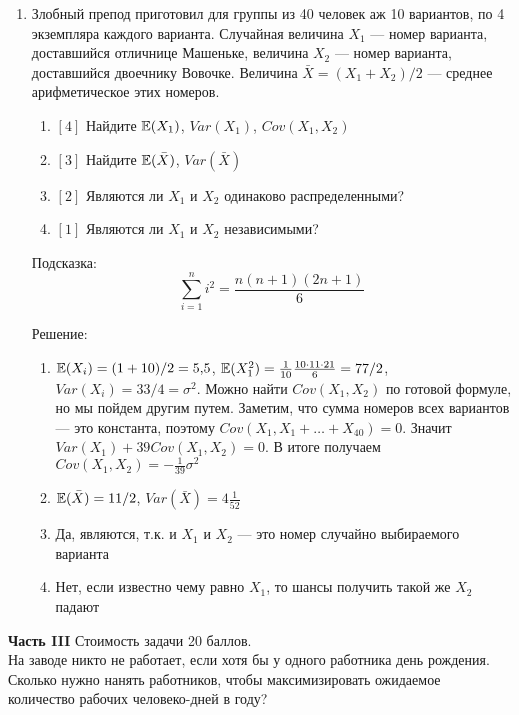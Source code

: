 \documentclass[pdftex,12pt,a4paper]{article}
\begin{document}
\begin{enumerate}
\item Злобный препод приготовил для группы из 40 человек аж 10 вариантов, по 4 экземпляра каждого варианта. Случайная величина $X_1$ --- номер варианта, доставшийся отличнице Машеньке, величина $X_2$ --- номер варианта, доставшийся двоечнику Вовочке. Величина $\bar{X}=(X_1+X_2)/2$ --- среднее арифметическое этих номеров.
\begin{enumerate}
\item $[4]$ Найдите $\mathbb{E}(X_1)$, $Var(X_1)$, $Cov(X_1,X_2)$
\item $[3]$ Найдите $\mathbb{E}(\bar{X})$, $Var(\bar{X})$
\item $[2]$ Являются ли $X_1$ и $X_2$ одинаково распределенными?
\item $[1]$ Являются ли $X_1$ и $X_2$ независимыми?
\end{enumerate}

Подсказка:
\begin{equation}
\sum_{i=1}^{n} i^2=\frac{n(n+1)(2n+1)}{6} 
\end{equation}

Решение:
\begin{enumerate}
\item $\mathbb{E}(X_i)=(1+10)/2=5{,}5$, $\mathbb{E}(X_1^2)=\frac{1}{10}\frac{10\cdot 11\cdot 21}{6}=77/2$, $Var(X_i)=33/4=\sigma^2$.
Можно найти $Cov(X_1,X_2)$ по готовой формуле, но мы пойдем другим путем. Заметим, что сумма номеров всех вариантов --- это константа, поэтому $Cov(X_1,X_1+\ldots+X_{40})=0$. Значит $Var(X_1)+39Cov(X_1,X_2)=0$. В итоге получаем $Cov(X_1,X_2)=-\frac{1}{39}\sigma^2$
\item $\mathbb{E}(\bar{X})=11/2$, $Var(\bar{X})=4\frac{1}{52}$
\item Да, являются, т.к. и $X_1$ и $X_2$ --- это номер случайно выбираемого варианта
\item Нет, если известно чему равно $X_1$, то шансы получить такой же $X_2$ падают
\end{enumerate}




\end{enumerate}

\textbf{Часть III} Стоимость задачи 20 баллов. \\ %


На заводе никто не работает, если хотя бы у одного работника день рождения. Сколько нужно нанять работников, чтобы максимизировать ожидаемое количество рабочих человеко-дней в году?
\end{document}
